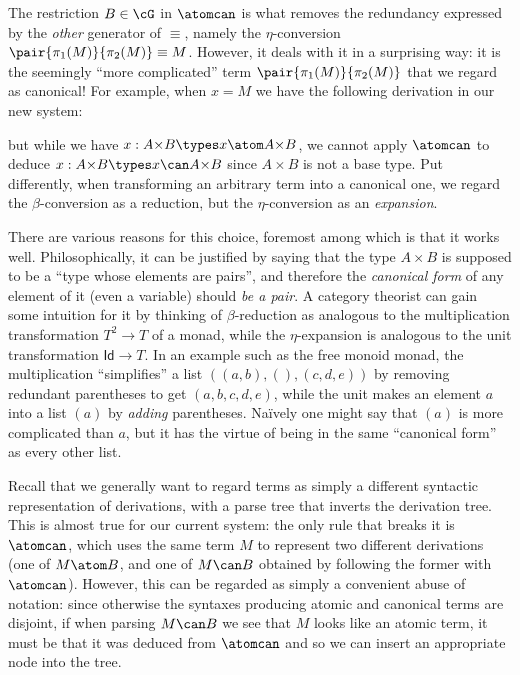 The restriction $B\in\cG$ in $\atomcan$ is what removes the redundancy expressed by the \emph{other} generator of $\equiv$, namely the $\eta$-conversion $\pair{\pi_1(M)}{\pi_2(M)}\equiv M$.
However, it deals with it in a surprising way: it is the seemingly ``more complicated'' term $\pair{\pi_1(M)}{\pi_2(M)}$ that we regard as canonical!
For example, when $x=M$ we have the following derivation in our new system:
\begin{mathpar}
\end{mathpar}
but while we have $x:A\times B\types x\atom A\times B$, we cannot apply $\atomcan$ to deduce $x:A\times B\types x\can A\times B$ since $A\times B$ is not a base type.
Put differently, when transforming an arbitrary term into a canonical one, we regard the $\beta$-conversion as a reduction, but the $\eta$-conversion as an \emph{expansion}.

There are various reasons for this choice, foremost among which is that it works well.
Philosophically, it can be justified by saying that the type $A\times B$ is supposed to be a ``type whose elements are pairs'', and therefore the \emph{canonical form} of any element of it (even a variable) should \emph{be a pair}.
A category theorist can gain some intuition for it by thinking of $\beta$-reduction as analogous to the multiplication transformation $T^2\to T$ of a monad, while the $\eta$-expansion is analogous to the unit transformation $\mathsf{Id}\to T$.
In an example such as the free monoid monad, the multiplication ``simplifies'' a list $((a,b),(),(c,d,e))$ by removing redundant parentheses to get $(a,b,c,d,e)$, while the unit makes an element $a$ into a list $(a)$ by \emph{adding} parentheses.
Na\"ively one might say that $(a)$ is more complicated than $a$, but it has the virtue of being in the same ``canonical form'' as every other list.

\begin{rmk}
  Recall that we generally want to regard terms as simply a different syntactic representation of derivations, with a parse tree that inverts the derivation tree.
  This is almost true for our current system: the only rule that breaks it is $\atomcan$, which uses the same term $M$ to represent two different derivations (one of $M\atom B$, and one of $M\can B$ obtained by following the former with $\atomcan$).
  However, this can be regarded as simply a convenient abuse of notation: since otherwise the syntaxes producing atomic and canonical terms are disjoint, if when parsing $M\can B$ we see that $M$ looks like an atomic term, it must be that it was deduced from $\atomcan$ and so we can insert an appropriate node into the tree.
\end{rmk}

